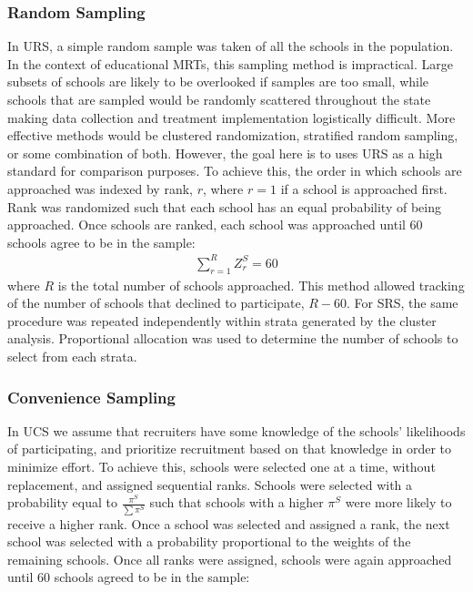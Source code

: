 \documentclass[man,floatsintext]{apa6}
\theoremstyle{definition}
\theoremstyle{definition}
\theoremstyle{definition}
\theoremstyle{remark}
\begin{document}
\hypertarget{random-sampling}{%
\subsubsection{Random Sampling}\label{random-sampling}}

In URS, a simple random sample was taken of all the schools in the
population. In the context of educational MRTs, this sampling method is
impractical. Large subsets of schools are likely to be overlooked if
samples are too small, while schools that are sampled would be randomly
scattered throughout the state making data collection and treatment
implementation logistically difficult. More effective methods would be
clustered randomization, stratified random sampling, or some combination
of both. However, the goal here is to uses URS as a high standard for
comparison purposes. To achieve this, the order in which schools are
approached was indexed by rank, \(r\), where \(r = 1\) if a school is
approached first. Rank was randomized such that each school has an equal
probability of being approached. Once schools are ranked, each school
was approached until 60 schools agree to be in the sample:
\begin{align} \label{eq:rankRS}
  \sum_{r=1}^R{Z^S_r} = 60
\end{align} where \(R\) is the total number of schools approached. This
method allowed tracking of the number of schools that declined to
participate, \(R - 60\). For SRS, the same procedure was repeated
independently within strata generated by the cluster analysis.
Proportional allocation was used to determine the number of schools to
select from each strata.

\hypertarget{convenience-sampling}{%
\subsubsection{Convenience Sampling}\label{convenience-sampling}}

In UCS we assume that recruiters have some knowledge of the schools'
likelihoods of participating, and prioritize recruitment based on that
knowledge in order to minimize effort. To achieve this, schools were
selected one at a time, without replacement, and assigned sequential
ranks. Schools were selected with a probability equal to
\(\frac{\pi^S}{\sum\pi^S}\) such that schools with a higher \(\pi^S\)
were more likely to receive a higher rank. Once a school was selected
and assigned a rank, the next school was selected with a probability
proportional to the weights of the remaining schools. Once all ranks
were assigned, schools were again approached until 60 schools agreed to
be in the sample:
\end{document}
